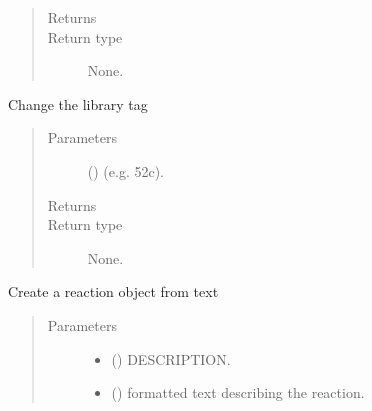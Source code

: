 \documentclass[letterpaper,10pt,english]{sphinxmanual}
\begin{document}
\begin{fulllineitems}
\begin{quote}
\begin{description}
\item[{Returns}] \leavevmode


\item[{Return type}] \leavevmode
None.

\end{description}\end{quote}

\begin{fulllineitems}
\label{\detokenize{api/inputgeneration:parsersD1S.Reaction.change_lib}}
Change the library tag
\begin{quote}\begin{description}
\item[{Parameters}] \leavevmode
{} () \textendash{} (e.g. 52c).

\item[{Returns}] \leavevmode


\item[{Return type}] \leavevmode
None.

\end{description}\end{quote}

\end{fulllineitems}


\begin{fulllineitems}
\label{\detokenize{api/inputgeneration:parsersD1S.Reaction.from_text}}
Create a reaction object from text
\begin{quote}\begin{description}
\item[{Parameters}] \leavevmode\begin{itemize}
\item {} 
 () \textendash{} DESCRIPTION.

\item {} 
 () \textendash{} formatted text describing the reaction.


\end{itemize}
\end{description}
\end{quote}
\end{fulllineitems}
\end{fulllineitems}
\end{document}
